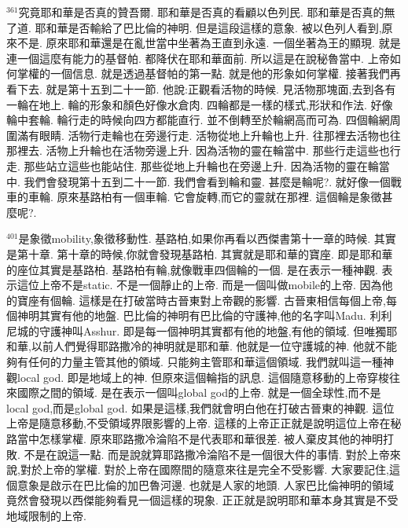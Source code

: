 \documentclass{book}
\begin{document}
$^{361}$究竟耶和華是否真的贊吾爾.
耶和華是否真的看顧以色列民.
耶和華是否真的無了道.
耶和華是否輸給了巴比倫的神明.
但是這段這樣的意象.
被以色列人看到,原來不是.
原來耶和華還是在亂世當中坐著為王直到永遠.
一個坐著為王的顯現.
就是連一個這麼有能力的基督帕.
都降伏在耶和華面前.
所以這是在說秘魯當中.
上帝如何掌權的一個信息.
就是透過基督帕的第一點.
就是他的形象如何掌權.
接著我們再看下去.
就是第十五到二十一節.
他說:正觀看活物的時候.
見活物那塊面,去到各有一輪在地上.
輪的形象和顏色好像水倉肉.
四輪都是一樣的樣式,形狀和作法.
好像輪中套輪.
輪行走的時候向四方都能直行.
並不倒轉至於輪網高而可為.
四個輪網周圍滿有眼睛.
活物行走輪也在旁邊行走.
活物從地上升輪也上升.
往那裡去活物也往那裡去.
活物上升輪也在活物旁邊上升.
因為活物的靈在輪當中.
那些行走這些也行走.
那些站立這些也能站住.
那些從地上升輪也在旁邊上升.
因為活物的靈在輪當中.
我們會發現第十五到二十一節.
我們會看到輪和靈.
甚麼是輪呢?.
就好像一個戰車的車輪.
原來基路柏有一個車輪.
它會旋轉,而它的靈就在那裡.
這個輪是象徵甚麼呢?.

$^{401}$是象徵mobility,象徵移動性.
基路柏,如果你再看以西傑書第十一章的時候.
其實是第十章.
第十章的時候,你就會發現基路柏.
其實就是耶和華的寶座.
即是耶和華的座位其實是基路柏.
基路柏有輪,就像戰車四個輪的一個.
是在表示一種神觀.
表示這位上帝不是static.
不是一個靜止的上帝.
而是一個叫做mobile的上帝.
因為他的寶座有個輪.
這樣是在打破當時古晉東對上帝觀的影響.
古晉東相信每個上帝,每個神明其實有他的地盤.
巴比倫的神明有巴比倫的守護神,他的名字叫Madu.
利利尼城的守護神叫Asshur.
即是每一個神明其實都有他的地盤,有他的領域.
但唯獨耶和華,以前人們覺得耶路撒冷的神明就是耶和華.
他就是一位守護城的神.
他就不能夠有任何的力量主管其他的領域.
只能夠主管耶和華這個領域.
我們就叫這一種神觀local god.
即是地域上的神.
但原來這個輪指的訊息.
這個隨意移動的上帝穿梭往來國際之間的領域.
是在表示一個叫global god的上帝.
就是一個全球性,而不是local god,而是global god.
如果是這樣,我們就會明白他在打破古晉東的神觀.
這位上帝是隨意移動,不受領域界限影響的上帝.
這樣的上帝正正就是說明這位上帝在秘路當中怎樣掌權.
原來耶路撒冷淪陷不是代表耶和華很差.
被人棄皮其他的神明打敗.
不是在說這一點.
而是說就算耶路撒冷淪陷不是一個很大件的事情.
對於上帝來說,對於上帝的掌權.
對於上帝在國際間的隨意來往是完全不受影響.
大家要記住,這個意象是啟示在巴比倫的加巴魯河邊.
也就是人家的地頭.
人家巴比倫神明的領域竟然會發現以西傑能夠看見一個這樣的現象.
正正就是說明耶和華本身其實是不受地域限制的上帝.
\end{document}
